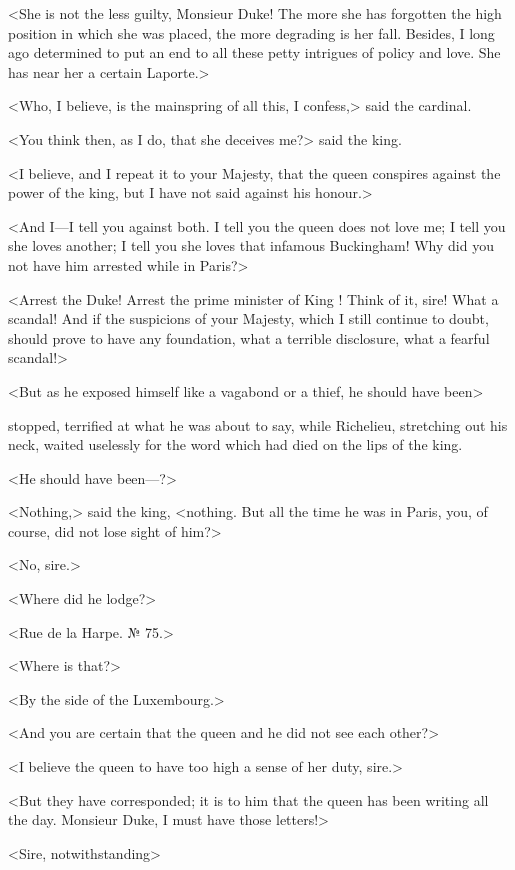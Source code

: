 <She is not the less guilty, Monsieur Duke! The more she has forgotten the high position in which she was placed, the more degrading is her fall. Besides, I long ago determined to put an end to all these petty intrigues of policy and love. She has near her a certain Laporte.> 

<Who, I believe, is the mainspring of all this, I confess,> said the cardinal. 

<You think then, as I do, that she deceives me?> said the king. 

<I believe, and I repeat it to your Majesty, that the queen conspires against the power of the king, but I have not said against his honour.> 

<And I—I tell you against both. I tell you the queen does not love me; I tell you she loves another; I tell you she loves that infamous Buckingham! Why did you not have him arrested while in Paris?> 

<Arrest the Duke! Arrest the prime minister of King ! Think of it, sire! What a scandal! And if the suspicions of your Majesty, which I still continue to doubt, should prove to have any foundation, what a terrible disclosure, what a fearful scandal!> 

<But as he exposed himself like a vagabond or a thief, he should have been\longdash> 

 stopped, terrified at what he was about to say, while Richelieu, stretching out his neck, waited uselessly for the word which had died on the lips of the king. 

<He should have been—?> 

<Nothing,> said the king, <nothing. But all the time he was in Paris, you, of course, did not lose sight of him?> 

<No, sire.> 

<Where did he lodge?> 

<Rue de la Harpe. № 75.> 

<Where is that?> 

<By the side of the Luxembourg.> 

<And you are certain that the queen and he did not see each other?> 

<I believe the queen to have too high a sense of her duty, sire.> 

<But they have corresponded; it is to him that the queen has been writing all the day. Monsieur Duke, I must have those letters!> 

<Sire, notwithstanding\longdash> 

